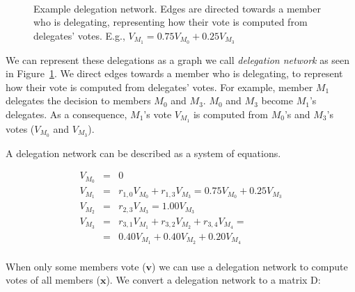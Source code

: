 \documentclass{sigchi}
\begin{document}
\begin{figure}
  \centering
  \caption{Example delegation network. Edges are directed towards a member who is delegating, representing how their
  vote is computed from delegates' votes. E.g., $V_{M_1} = 0.75 V_{M_0} + 0.25 V_{M_3}$}~\label{fig:delegation-network}
\end{figure}

We can represent these delegations as a graph we call \emph{delegation network} as seen in
Figure~\ref{fig:delegation-network}.
We direct edges towards a member who is delegating, to represent how their vote is computed from delegates' votes.
For example, member $M_1$ delegates the decision to members $M_0$ and $M_3$.
$M_0$ and $M_3$ become $M_1$'s delegates.
As a consequence, $M_1$'s vote $V_{M_1}$ is computed from $M_0$'s and $M_3$'s votes ($V_{M_0}$ and $V_{M_3}$).

A delegation network can be described as a system of equations.

\begin{displaymath}
\begin{array}{rcl}
V_{M_0} & = & 0 \\
V_{M_1} & = & r_{1,0} V_{M_0} + r_{1,3} V_{M_3} = 0.75 V_{M_0} + 0.25 V_{M_3} \\
V_{M_2} & = & r_{2,3} V_{M_3} = 1.00 V_{M_3} \\
V_{M_3} & = & r_{3,1} V_{M_1} + r_{3,2} V_{M_2} + r_{3,4} V_{M_4} = \\
& = & 0.40 V_{M_1} + 0.40 V_{M_2} + 0.20 V_{M_4} \\
\end{array}
\end{displaymath}

When only some members vote ($\mathbf{v}$) we can use a delegation network to compute votes
of all members ($\mathbf{x}$).
We convert a delegation network to a matrix $\mathrm{D}$:
\end{document}
